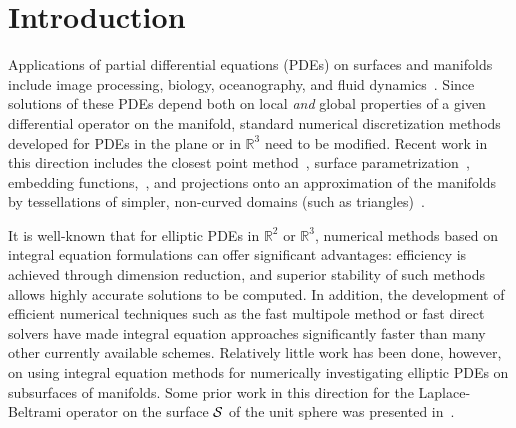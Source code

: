 \section{Introduction}

Applications of partial differential equations (PDEs) on surfaces and
manifolds include image processing, biology, oceanography, and fluid
dynamics~\cite{Chaplain,Myers,Witkin}.  Since solutions of these PDEs
depend both on local {\it and} global properties of a given
differential operator on the manifold, standard numerical
discretization methods developed for PDEs in the plane or in
$\mathbb{R}^3$ need to be modified. Recent work in this direction
includes the closest point method~\cite{ruuth}, surface
parametrization~\cite{floater}, embedding functions,~\cite{Bertalmio},
and projections onto an approximation of the manifolds by tessellations
of simpler, non-curved domains (such as triangles)~\cite{lindblom}. 

It is well-known that for elliptic PDEs in $\mathbb{R}^2$ or
$\mathbb{R}^3$, numerical methods based on integral equation
formulations can offer significant advantages: efficiency is achieved
through dimension reduction, and superior stability of such methods
allows highly accurate solutions to be computed.  In addition, the
development of efficient numerical techniques such as the fast
multipole method or fast direct solvers have made integral equation
approaches significantly faster than many other currently available
schemes.  Relatively little work has been done, however, on using
integral equation methods for numerically investigating elliptic PDEs
on subsurfaces of manifolds.  Some prior work in this direction for the
Laplace-Beltrami operator on the surface $\cal{S}$ of the unit sphere
was presented in~\cite{gemmrich,kro:nig2013}.

